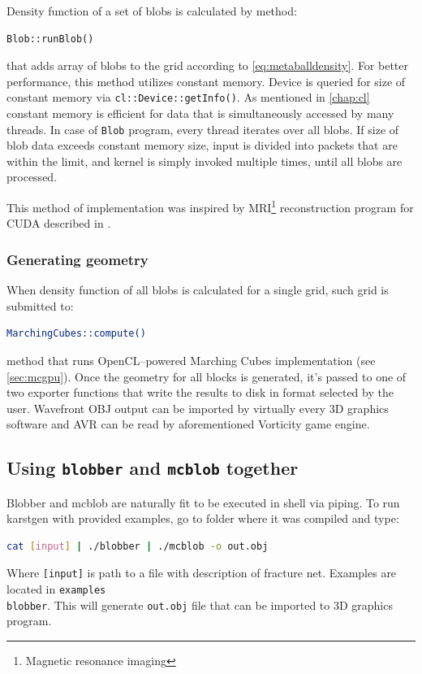 Density function of a set of blobs is calculated by method:
\begin{lstlisting}[numbers=none]
Blob::runBlob()
\end{lstlisting}
that adds array of blobs to the grid according to \autoref{eq:metaballdensity}.
For better performance, this method utilizes constant memory. Device is queried
for size of constant memory via \texttt{cl::Device::getInfo()}. As
mentioned in \autoref{chap:cl} constant memory is efficient for data that is
simultaneously accessed by many threads. In case of \texttt{Blob} program,
every thread iterates over all blobs. If size of blob data exceeds constant
memory size, input is divided into packets that are within the limit, and kernel
is simply invoked multiple times, until all blobs are processed.

This method of implementation was inspired by MRI\footnote{Magnetic resonance imaging}
reconstruction program for CUDA described in \cite[in chapter~8]{Kirk:2010:PMP:1841511}.

\subsubsection{Generating geometry}

When density function of all blobs is calculated for a single grid, such grid
is submitted to:
\begin{lstlisting}[language=bash,numbers=none]
MarchingCubes::compute()
\end{lstlisting}
method that runs OpenCL--powered
Marching Cubes implementation (see \autoref{sec:mcgpu}). Once the geometry for
all blocks is generated, it's passed to one of two exporter functions that write
the results to disk in format selected by the user. Wavefront OBJ output can be
imported by virtually every 3D graphics software and AVR can be read by aforementioned
Vorticity game engine.

\subsection{Using \texttt{blobber} and \texttt{mcblob} together}

Blobber and mcblob are naturally fit to be executed in shell via piping. To
run karstgen with provided examples, go to folder where it was compiled and
type:
\begin{lstlisting}[language=bash,numbers=none]
cat [input] | ./blobber | ./mcblob -o out.obj
\end{lstlisting}
Where \texttt{[input]} is path to a file with description of fracture net.
Examples are located in \texttt{examples\\blobber}.
This will generate \texttt{out.obj} file that can be imported to 3D graphics
program.

